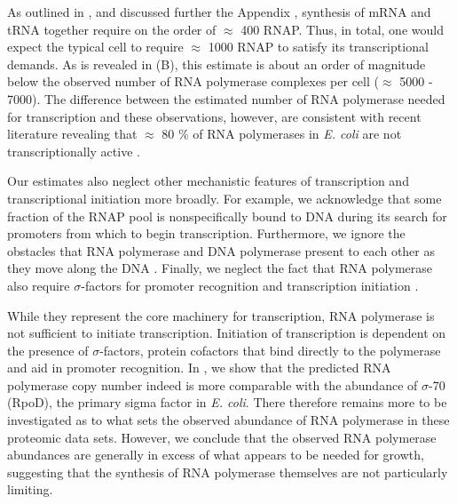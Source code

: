 As outlined in , and discussed further the Appendix
, synthesis of mRNA and tRNA together require
on the order of $\approx$ 400 RNAP. Thus, in total, one would expect the
typical cell to require $\approx$ 1000 RNAP to satisfy its transcriptional
demands. As is revealed in (B), this estimate is about an
order of magnitude below the observed number of RNA polymerase complexes per
cell ($\approx$ 5000 - 7000). The difference between the estimated number of
RNA polymerase needed for transcription and these observations, however, are
consistent with recent literature revealing that $\approx$ 80 \% of RNA
polymerases in \textit{E. coli} are not transcriptionally active
\citep{patrick2015}.

Our estimates also neglect other mechanistic features of transcription and
transcriptional initiation more broadly. For example, we acknowledge that some
fraction of the RNAP pool is nonspecifically bound to DNA during its search for
promoters from which to begin transcription. Furthermore, we ignore the
obstacles that RNA polymerase and DNA polymerase present to each other as they
move along the DNA \citep{finkelstein2013}. Finally, we neglect the fact that
RNA polymerase also require $\sigma$-factors for promoter recognition and
transcription initiation \citep{browning2016}.

While they represent the core machinery for transcription, RNA polymerase is not
sufficient to initiate transcription. Initiation of
transcription is dependent on the presence of $\sigma$-factors, protein
cofactors that bind directly to the polymerase \citep{browning2016} and aid in promoter recognition. In
, we show that the predicted RNA polymerase
copy number indeed is more comparable with the abundance of $\sigma$-70
(RpoD), the primary sigma factor in \textit{E. coli}. There therefore remains
more to be investigated as to what sets the observed abundance of RNA
polymerase in these proteomic data sets. However, we conclude that the
observed RNA polymerase abundances are generally in
excess of what appears to be needed for growth, suggesting that the synthesis
of RNA polymerase themselves are not particularly limiting.

